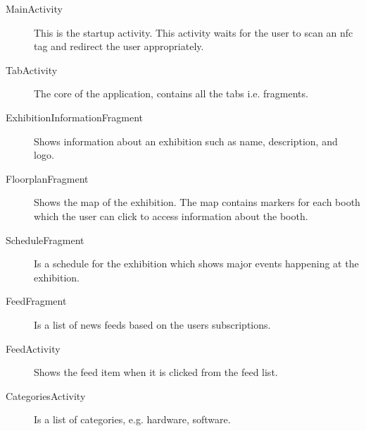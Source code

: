 \begin{description}
\item[MainActivity] This is the startup activity. This activity waits for the user to scan an \ac{nfc} tag and redirect the user appropriately.
\item[TabActivity] The core of the application, contains all the tabs i.e. fragments.
\item[ExhibitionInformationFragment] Shows information about an exhibition such as name, description, and logo.
\item[FloorplanFragment] Shows the map of the exhibition. The map contains markers for each booth which the user can click to access information about the booth.
\item[ScheduleFragment] Is a schedule for the exhibition which shows major events happening at the exhibition.
\item[FeedFragment] Is a list of news feeds based on the users subscriptions.
\item[FeedActivity] Shows the feed item when it is clicked from the feed list.
\item[CategoriesActivity] Is a list of categories, e.g. hardware, software.
\end{description}

